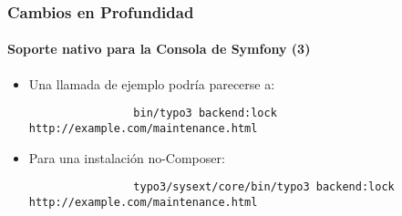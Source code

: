 \begin{frame}[fragile]
	\frametitle{Cambios en Profundidad}
	\framesubtitle{Soporte nativo para la Consola de Symfony (3)}

	\lstset{basicstyle=\tiny\ttfamily}

	\begin{itemize}

		\item Una llamada de ejemplo podría parecerse a:
			\begin{lstlisting}
				bin/typo3 backend:lock http://example.com/maintenance.html
			\end{lstlisting}

		\item Para una instalación no-Composer:
			\begin{lstlisting}
				typo3/sysext/core/bin/typo3 backend:lock http://example.com/maintenance.html
			\end{lstlisting}

	\end{itemize}

\end{frame}

